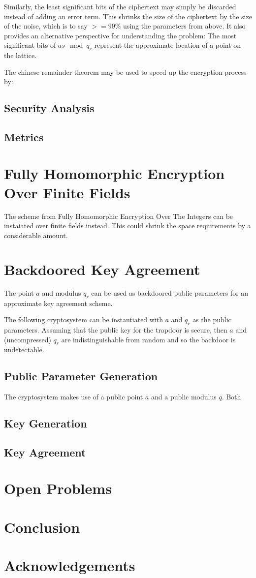 \documentclass[preprint]{iacrtrans}
\begin{document}
Similarly, the least significant bits of the ciphertext may simply be discarded instead of adding an error term. This shrinks the size of the ciphertext by the size of the noise, which is to say $>= 99\%$ using the parameters from above. It also provides an alternative perspective for understanding the problem: The most significant bits of $a s \mod q_r$ represent the approximate location of a point on the lattice. 

The chinese remainder theorem may be used to speed up the encryption process by: 

\subsection{Security Analysis}
\todo{}

\subsection{Metrics}
\todo{}

\section{Fully Homomorphic Encryption Over Finite Fields}
The scheme from Fully Homomorphic Encryption Over The Integers can be instaiated over finite fields instead. This could shrink the space requirements by a considerable amount.


\section{Backdoored Key Agreement}
The point $a$ and modulus $q_r$ can be used as backdoored public parameters for an approximate key agreement scheme.

The following cryptosystem can be instantiated with $a$ and $q_r$ as the public parameters. Assuming that the public key for the trapdoor is secure, then $a$ and (uncompressed) $q_r$ are indistinguishable from random and so the backdoor is undetectable.

\subsection{Public Parameter Generation}
The cryptosystem makes use of a public point $a$ and a public modulus $q$. Both 



\subsection{Key Generation}
\subsection{Key Agreement}
\section{Open Problems}
\todo{}

\section{Conclusion}
\todo{}

\section*{Acknowledgements}
\end{document}
